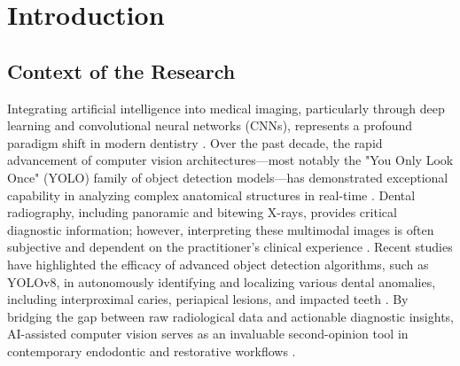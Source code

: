 \chapter{Introduction}
\label{ch:intro}

\section{Context of the Research}
Integrating artificial intelligence into medical imaging, particularly through deep learning and convolutional neural networks (CNNs), represents a profound paradigm shift in modern dentistry \cite{alenezi2023artificial, bozkurt2023deep, khan2021clinical, lecun2015deep}. Over the past decade, the rapid advancement of computer vision architectures—most notably the "You Only Look Once" (YOLO) family of object detection models—has demonstrated exceptional capability in analyzing complex anatomical structures in real-time \cite{geetha2024ai, lin2014microsoft, redmon2016you}. Dental radiography, including panoramic and bitewing X-rays, provides critical diagnostic information; however, interpreting these multimodal images is often subjective and dependent on the practitioner's clinical experience \cite{chen2022comprehensive, kim2020automated, rahman2021deep}. Recent studies have highlighted the efficacy of advanced object detection algorithms, such as YOLOv8, in autonomously identifying and localizing various dental anomalies, including interproximal caries, periapical lesions, and impacted teeth \cite{devito2023advanced, hao2023innovative, lee2023detection, sharma2024early}. By bridging the gap between raw radiological data and actionable diagnostic insights, AI-assisted computer vision serves as an invaluable second-opinion tool in contemporary endodontic and restorative workflows \cite{endres2020development, hwang2019overview, mohammad2022deep, wang2022automated}.

